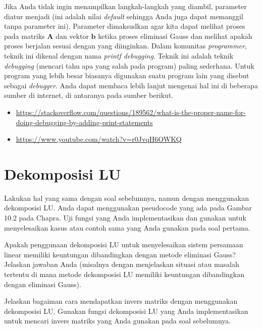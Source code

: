 Jika Anda tidak ingin menampilkan langkah-langkah yang diambil, parameter
 diatur menjadi  (ini adalah nilai \textit{default}
sehingga Anda juga dapat memanggil  tanpa parameter ini).
Parameter  dimaksudkan agar kita dapat melihat
proses pada matriks $\mathbf{A}$ dan vektor $\mathbf{b}$ ketika
proses eliminasi Gauss dan melihat apakah proses berjalan
sesuai dengan yang diinginkan.
Dalam komunitas \textit{programmer}, teknik ini dikenal
dengan nama \textit{printf debugging}. Teknik ini adalah
teknik \textit{debugging} (mencari tahu apa yang salah pada program)
paling sederhana. Untuk program yang lebih besar biasanya digunakan
suatu program lain yang disebut sebagai \textit{debugger}.
Anda dapat membaca lebih lanjut mengenai
hal ini di beberapa sumber di internet, di antaranya pada sumber
berikut.
\begin{itemize}
\item {\footnotesize\url{https://stackoverflow.com/questions/189562/what-is-the-proper-name-for-doing-debugging-by-adding-print-statements}}
\item {\footnotesize\url{https://www.youtube.com/watch?v=r0JvqH6OWKQ}}
\end{itemize}



\section{Dekomposisi LU}

\begin{soal}
Lakukan hal yang sama dengan soal sebelumnya, namun dengan menggunakan
dekomposisi LU.
Anda dapat menggunakan pseudocode yang ada pada Gambar 10.2 pada Chapra.
Uji fungsi yang Anda implementasikan dan gunakan untuk menyelesaikan
kasus atau contoh sama yang Anda gunakan pada soal pertama.
\end{soal}

\begin{soal}
Apakah penggunaan dekomposisi LU untuk menyelesaikan sistem persamaan linear memiliki keuntungan
dibandingkan dengan metode eliminasi Gauss? Jelaskan jawaban Anda (misalnya dengan menjelaskan
situasi atau masalah tertentu di mana metode dekomposisi LU memiliki keuntungan dibandingkan
dengan eliminasi Gauss).
\end{soal}

\begin{soal}
Jelaskan bagaiman cara mendapatkan invers matriks dengan menggunakan
dekomposisi LU. Gunakan fungsi dekomposisi LU yang Anda implementasikan
untuk mencari invers matriks yang Anda gunakan pada soal sebelumnya.
\end{soal}

